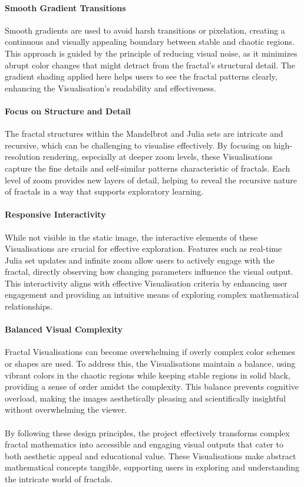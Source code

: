 \documentclass[12pt,a4paper]{report}
\begin{document}
\paragraph{Smooth Gradient Transitions}
Smooth gradients are used to avoid harsh transitions or pixelation, creating a continuous and visually appealing boundary between stable and chaotic regions. This approach is guided by the principle of reducing visual noise, as it minimizes abrupt color changes that might detract from the fractal’s structural detail. The gradient shading applied here helps users to see the fractal patterns clearly, enhancing the Visualisation’s readability and effectiveness.

\paragraph{Focus on Structure and Detail}
The fractal structures within the Mandelbrot and Julia sets are intricate and recursive, which can be challenging to visualise effectively. By focusing on high-resolution rendering, especially at deeper zoom levels, these Visualisations capture the fine details and self-similar patterns characteristic of fractals. Each level of zoom provides new layers of detail, helping to reveal the recursive nature of fractals in a way that supports exploratory learning. 

\paragraph{Responsive Interactivity}
While not visible in the static image, the interactive elements of these Visualisations are crucial for effective exploration. Features such as real-time Julia set updates and infinite zoom allow users to actively engage with the fractal, directly observing how changing parameters influence the visual output. This interactivity aligns with effective Visualisation criteria by enhancing user engagement and providing an intuitive means of exploring complex mathematical relationships. 

\paragraph{Balanced Visual Complexity}
Fractal Visualisations can become overwhelming if overly complex color schemes or shapes are used. To address this, the Visualisations maintain a balance, using vibrant colors in the chaotic regions while keeping stable regions in solid black, providing a sense of order amidst the complexity. This balance prevents cognitive overload, making the images aesthetically pleasing and scientifically insightful without overwhelming the viewer. 
\\\\
By following these design principles, the project effectively transforms complex fractal mathematics into accessible and engaging visual outputs that cater to both aesthetic appeal and educational value. These Visualisations make abstract mathematical concepts tangible, supporting users in exploring and understanding the intricate world of fractals. 
\end{document}

